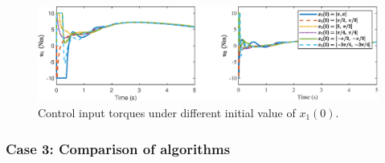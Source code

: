\documentclass[pdflatex,sn-mathphys-num]{sn-jnl}%
\theoremstyle{thmstyleone}%
\theoremstyle{thmstyletwo}%
\theoremstyle{thmstylethree}%
\begin{document}

\begin{figure}[H]
	\centering
	\includegraphics[width=0.9\linewidth]{fig8.eps}
	\caption{Control input torques under different initial value of \(x_1(0)\).}
	\label{fig:8}
\end{figure}




\subsubsection*{Case 3: Comparison of algorithms}



\end{document}

